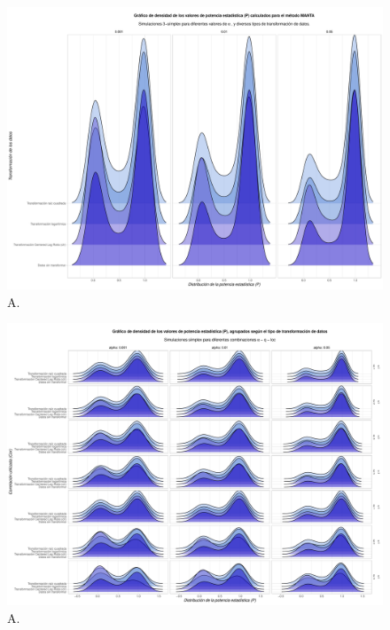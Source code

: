\documentclass[IB,BIB]{TFUOC}%
\begin{document}
\begin{figure}[!htbp]
\hspace*{-2.1cm} %
    \centering
    \includegraphics[scale=.3]{OBJ2SimplexStatswrapAlpha.pdf}
    \caption{\scriptsize{A.}}
    \label{figAppend:OBJ2SimplexStatswrapAlpha}
\end{figure}

\begin{figure}[!htbp]
\hspace*{-2.1cm} %
    \centering
    \includegraphics[scale=.3]{OBJ2SimplexStatsGridqloc.pdf}
    \caption{\scriptsize{A.}}
    \label{figAppend:OBJ2SimplexStatsGridqloc}
\end{figure}
\end{document}
